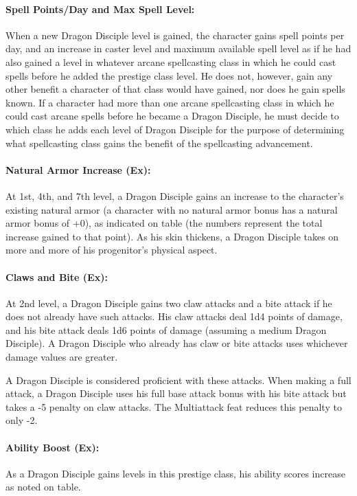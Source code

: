\paragraph{Spell Points/Day and Max Spell Level:} 
When a new Dragon Disciple level is gained, the character gains spell points per day, and an increase in caster level and maximum available spell level as if he had also gained a level in whatever arcane spellcasting class in which he could cast spells before he added the prestige class level. 
He does not, however, gain any other benefit a character of that class would have gained, nor does he gain spells known. 
If a character had more than one arcane spellcasting class in which he could cast arcane spells before he became a Dragon Disciple, 
he must decide to which class he adds each level of Dragon Disciple for the purpose of determining what spellcasting class gains the benefit of the spellcasting advancement.

\paragraph{Natural Armor Increase (Ex):}
At 1st, 4th, and 7th level, a Dragon Disciple gains an increase to the character's existing natural armor (a character with no natural armor bonus has a natural armor bonus of +0), as indicated on  table (the numbers represent the total increase gained to that point). 
As his skin thickens, a Dragon Disciple takes on more and more of his progenitor's physical aspect.

\paragraph{Claws and Bite (Ex):}
At 2nd level, a Dragon Disciple gains two claw attacks and a bite attack if he does not already have such attacks. 
His claw attacks deal 1d4 points of damage, and his bite attack deals 1d6 points of damage (assuming a medium Dragon Disciple).
A Dragon Disciple who already has claw or bite attacks uses whichever damage values are greater.

A Dragon Disciple is considered proficient with these attacks. When making a full attack, a Dragon Disciple uses his full base attack bonus with his bite attack but takes a -5 penalty on claw attacks. 
The Multiattack feat reduces this penalty to only -2.

\paragraph{Ability Boost (Ex):}
As a Dragon Disciple gains levels in this prestige class, his ability scores increase as noted on  table.

